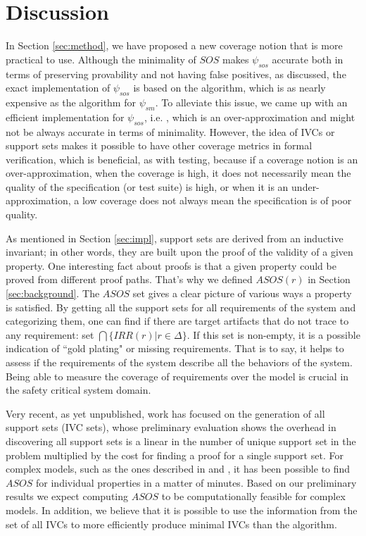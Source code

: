 \section{Discussion}
\label{sec:discussion}

In Section \ref{sec:method}, we have proposed a new coverage notion that
is more practical to use. Although the minimality of $SOS$ makes $\psi_{sos}$ accurate
 both in terms of preserving provability and not having false positives, as discussed, the exact implementation of $\psi_{sos}$ is based on the \ucbfalg algorithm, which is as nearly expensive as the \mustalg algorithm for $\psi_{sm}$.
 To alleviate this issue, we came up with an efficient implementation for $\psi_{sos}$, i.e. \ucalg \cite{Ghass16}, 
 which is an over-approximation and might not be always accurate in terms of minimality. 
 However, the idea of IVCs or support sets makes
it possible to have other coverage metrics in formal verification, which is beneficial, as with testing, because if a
coverage notion is an over-approximation, when the coverage
 is high, it does not necessarily mean the quality of
 the specification (or test suite) is high, or when it is an under-approximation, a low coverage does not always mean the specification is of poor quality.

 As mentioned in Section \ref{sec:impl}, support sets are derived from an inductive invariant; in other words, they are built upon the proof of the validity of a given property. One interesting fact about proofs
  is that a given property could be proved from different proof paths. That's why we defined $ASOS(r)$ in Section \ref{sec:background}. The $ASOS$ set gives a clear picture of various ways a property is satisfied. By getting all the support sets for all requirements of the system and categorizing them, one can find if there are target artifacts that do not trace to any requirement: set $\bigcap \{IRR (r) | r \in \Delta \}$.  If this set is non-empty, it is a possible indication of ``gold plating" or missing requirements. That is to say, it helps to assess if the requirements of the system describe all the behaviors of the system. Being able to measure the coverage of requirements over the model is crucial in the safety critical system domain.

Very recent, as yet unpublished, work has focused on the
generation of all support sets (IVC sets), whose preliminary evaluation
shows the overhead in discovering all support sets is a linear in the
number of unique support set in the problem multiplied by the cost
for finding a proof for a single support set. For complex models, such
as the ones described in \cite {QFCS15:backes} and \cite{hilt2013}, it has been possible to
find $ASOS$ for individual properties in a matter of minutes.
Based on our preliminary results we expect computing $ASOS$ to be computationally feasible for complex models. In
addition, we believe that it is possible to use the information
from the set of all IVCs to more efficiently produce minimal
IVCs than the \ucbfalg algorithm.

